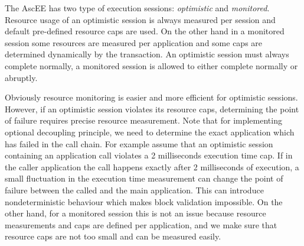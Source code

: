 The AscEE has two type of execution sessions: \emph{optimistic} and \emph{monitored}. Resource usage of an optimistic
session is always measured per session and default pre-defined resource caps are used. On the other hand in a monitored
session some resources are measured per application and some
caps are determined dynamically by the transaction. An optimistic session must always
complete normally, a monitored session is allowed to either complete normally or abruptly.

Obviously resource monitoring is easier and more efficient for optimistic sessions. However, if
an optimistic session violates its resource caps, determining the point of failure requires precise resource
measurement. Note that for implementing optional decoupling principle, we need to determine the exact application
which has failed in the call chain. For example assume that an optimistic session containing an application call
violates a 2 milliseconds execution time cap. If in the caller application the call happens exactly after 2
milliseconds of execution, a small fluctuation in the execution time measurement can
change the point of failure between the called and the main application. This can introduce nondeterministic
behaviour which makes block validation impossible. On the other hand, for a monitored session this is not an issue
because resource measurements and caps are defined per application, and we make sure that resource caps are not too
small and can be measured easily.

